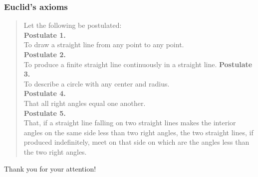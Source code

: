 \documentclass[compress,12pt]{beamer}
\begin{document}
\begin{frame}
    \frametitle{Euclid's axioms}
    \begin{quote}
        Let the following be postulated:\\
        \textbf{Postulate 1.}\\
        To draw a straight line from any point to any point.\\
        \textbf{Postulate 2.}\\
        To produce a finite straight line continuously in a straight line.
        \textbf{Postulate 3.}\\
        To describe a circle with any center and radius.\\
        \textbf{Postulate 4.}\\
        That all right angles equal one another.\\
        \textbf{Postulate 5.}\\
        That, if a straight line falling on two straight lines makes the interior angles on the same side less than two right angles, the two straight lines, if produced indefinitely, meet on that side on which are the angles less than the two right angles.
    \end{quote}
\end{frame}

\End

\begin{frame}
      \centering\large
      Thank you for your attention!
      
\end{frame}
\end{document}
